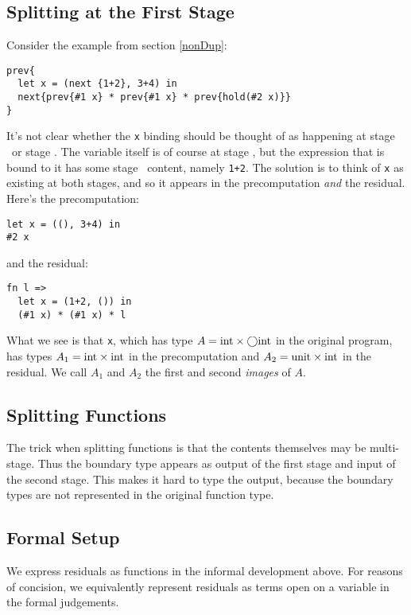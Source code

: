 \subsection {Splitting at the First Stage}

Consider the example from section \ref{nonDup}:

\begin{lstlisting} 
prev{
  let x = (next {1+2}, 3+4) in
  next{prev{#1 x} * prev{#1 x} * prev{hold(#2 x)}}
}
\end{lstlisting}

It's not clear whether the {\tt x} binding should be thought of as happening at stage \bbone\ or stage \bbtwo.
The variable itself is of course at stage \bbone, but the expression that is bound to it has some stage \bbtwo\ content, namely \verb|1+2|.
The solution is to think of {\tt x} as existing at both stages, and so it appears in the precomputation {\em and} the residual.
Here's the precomputation:
\begin{lstlisting} 
let x = ((), 3+4) in 
#2 x
\end{lstlisting}
and the residual:
\begin{lstlisting} 
fn l =>
  let x = (1+2, ()) in 
  (#1 x) * (#1 x) * l
\end{lstlisting}
What we see is that {\tt x}, which has type $A = {\rm int} \times \bigcirc {\rm int}$ in the original program, 
has types $A_1 = {\rm int} \times {\rm int}$ in the precomputation and $A_2 = {\rm unit} \times {\rm int}$ in the residual.
We call $A_1$ and $A_2$ the first and second {\em images} of $A$.

\subsection {Splitting Functions}

The trick when splitting functions is that the contents themselves may be multi-stage.
Thus the boundary type appears as output of the first stage and input of the second stage.
This makes it hard to type the output, because the boundary types are not represented in the original function type.

\subsection {Formal Setup}

We express residuals as functions in the informal development above.
For reasons of concision, we equivalently represent residuals as terms open on a variable in the formal judgements.

